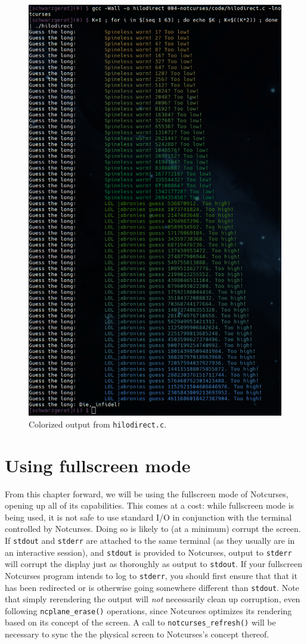 \documentclass[letterpaper,10pt]{article}
\begin{document}
\begin{figure}[!htbp]
\centering \includegraphics[width=.75\linewidth]{media/hilodirect.png}
\caption{Colorized output from \texttt{hilodirect.c}.}
\label{fig:colorguess}
\end{figure}
\newpage

\section{Using fullscreen mode}
From this chapter forward, we will be using the fullscreen mode of Notcurses,
opening up all of its capabilities. This comes at a cost: while fullscreen mode
is being used, it is not safe to use standard I/O in conjunction with the
terminal controlled by Notcurses. Doing so is likely to (at a minimum) corrupt
the screen. If \texttt{stdout} and \texttt{stderr} are attached to the same
terminal (as they usually are in an interactive session), and \texttt{stdout}
is provided to Notcurses, output to \texttt{stderr} will corrupt the display
just as thoroughly as output to \texttt{stdout}. If your fullscreen Notcurses
program intends to log to \texttt{stderr}, you should first ensure that that
it has been redirected or is otherwise going somewhere different than
\texttt{stdout}. Note that simply rerendering the output will \textit{not}
necessarily clean up corruption, even following \texttt{ncplane\_erase()}
operations, since Notcurses optimizes its rendering based on its concept of the
screen. A call to \texttt{notcurses\_refresh()} will be necessary to sync the
the physical screen to Notcurses's concept thereof.
\end{document}
